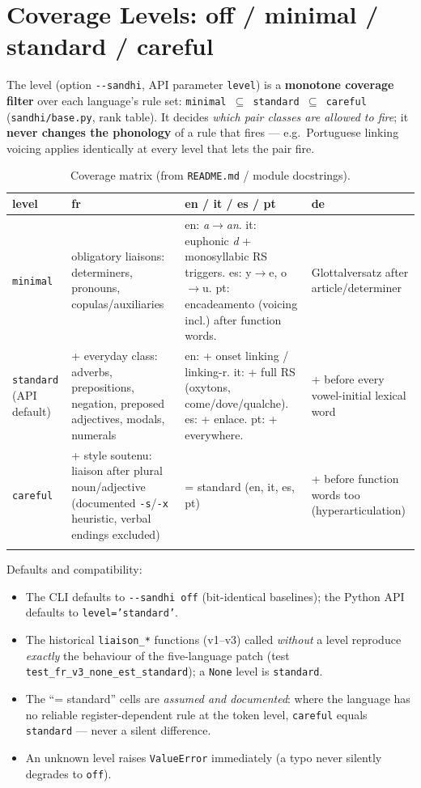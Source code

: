 \documentclass[11pt,a4paper]{report}
\newcommand{\smp}[1]{\texttt{#1}}          %
\begin{document}
\chapter{Coverage Levels: off / minimal / standard / careful}
\label{chap:levels}

The level (option \smp{-{}-sandhi}, API parameter \smp{level}) is a
\textbf{monotone coverage filter} over each language's rule set:
\smp{minimal $\subseteq$ standard $\subseteq$ careful} (\smp{sandhi/base.py},
rank table). It decides \emph{which pair classes are allowed to fire}; it
\textbf{never changes the phonology} of a rule that fires — e.g.\ Portuguese
linking voicing applies identically at every level that lets the pair fire.

\begin{longtable}{@{}p{17mm}p{54mm}p{42mm}p{31mm}@{}}
\toprule
level & fr & en / it / es / pt & de \\
\midrule
\endhead
\smp{minimal} &
obligatory liaisons: determiners, pronouns, copulas/auxiliaries &
en: \emph{a}$\rightarrow$\emph{an}. it: euphonic \emph{d} + monosyllabic
RS triggers. es: y$\rightarrow$e, o$\rightarrow$u. pt: encadeamento
(voicing incl.) after function words. &
Glottalversatz after article/determiner \\[2mm]
\smp{standard} (API default) &
+ everyday class: adverbs, prepositions, negation, preposed adjectives,
modals, numerals &
en: + onset linking / linking-r. it: + full RS (oxytons,
come/dove/qualche). es: + enlace. pt: + everywhere. &
+ before every vowel-initial lexical word \\[2mm]
\smp{careful} &
+ style soutenu: liaison after plural noun/adjective (documented
\smp{-s}/\smp{-x} heuristic, verbal endings excluded) &
= standard (en, it, es, pt) &
+ before function words too (hyperarticulation) \\
\bottomrule
\caption{Coverage matrix (from \smp{README.md} / module docstrings).}
\end{longtable}

Defaults and compatibility:

\begin{itemize}
  \item The CLI defaults to \smp{-{}-sandhi off} (bit-identical
        baselines); the Python API defaults to
        \smp{level=\allowbreak'standard'}.
  \item The historical \smp{liaison\_*} functions (v1--v3) called
        \emph{without} a level reproduce \emph{exactly} the behaviour of the
        five-language patch (test \smp{test\_fr\_v3\_none\_est\_standard});
        a \smp{None} level is \smp{standard}.
  \item The ``= standard'' cells are \emph{assumed and documented}: where
        the language has no reliable register-dependent rule at the token
        level, \smp{careful} equals \smp{standard} — never a silent
        difference.
  \item An unknown level raises \smp{ValueError} immediately
        (a typo never silently degrades to \smp{off}).
\end{itemize}
\end{document}
